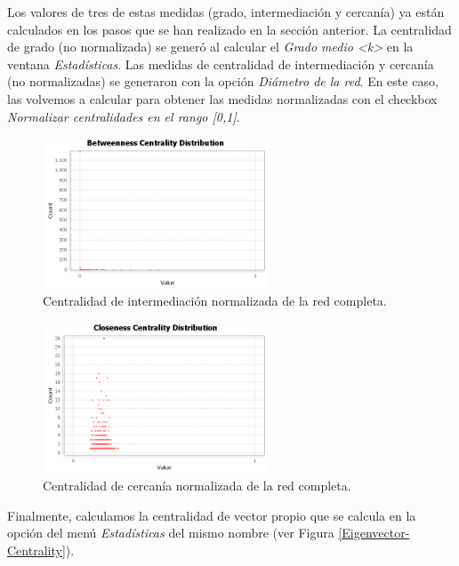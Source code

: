 \documentclass{uimppracticas}
\begin{document}
Los valores de tres de estas medidas (grado, intermediación y cercanía) ya están calculados en los pasos que se han realizado en la sección anterior. La centralidad de grado (no normalizada) se generó al calcular el \textit{Grado medio <k>} en la ventana \textit{Estadísticas}. Las medidas de centralidad de intermediación y cercanía (no normalizadas) se generaron con la opción \textit{Diámetro de la red}. En este caso, las volvemos a calcular para obtener las medidas normalizadas con el checkbox \textit{Normalizar centralidades en el rango [0,1]}.

\begin{figure}[H]
	\centering
	\includegraphics[width=0.6\textwidth]{images/Betweenness-Centrality-Distribution-Norm}
	\caption{Centralidad de intermediación normalizada de la red completa.}
	\label{Betweenness-Centrality-Distribution-Norm}
\end{figure}

\begin{figure}[H]
	\centering
	\includegraphics[width=0.6\textwidth]{images/Closeness-Centrality-Distribution-Norm}
	\caption{Centralidad de cercanía normalizada de la red completa.}
	\label{Closeness-Centrality-Distribution-Norm}
\end{figure}

Finalmente, calculamos la centralidad de vector propio que se calcula en la opción del menú \textit{Estadísticas} del mismo nombre (ver Figura \ref{Eigenvector-Centrality}).
\end{document}
